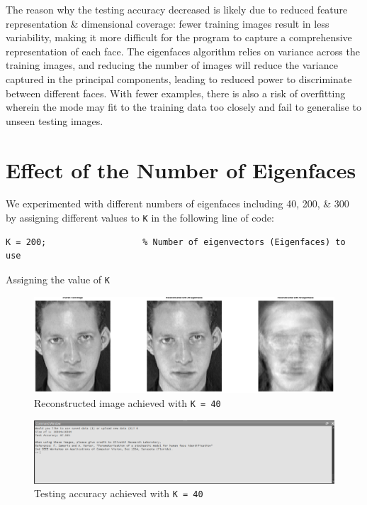 \documentclass[a4paper]{article}
\newenvironment{code}{\captionsetup{type=listing}}{}
\begin{document}
The reason why the testing accuracy decreased is likely due to reduced feature representation \& dimensional coverage:
fewer training images result in less variability, making it more difficult for the program to capture a comprehensive representation of each face.
The eigenfaces algorithm relies on variance across the training images, and reducing the number of images will reduce the variance captured in the principal components, leading to reduced power to discriminate between different faces.
With fewer examples, there is also a risk of overfitting wherein the mode may fit to the training data too closely and fail to generalise to unseen testing images.

\section{Effect of the Number of Eigenfaces}

We experimented with different numbers of eigenfaces including 40, 200, \& 300 by assigning different values to \texttt{K} in the following line of code:
\begin{code}
\begin{verbatim}
K = 200;                   % Number of eigenvectors (Eigenfaces) to use
\end{verbatim}
\caption{Assigning the value of \texttt{K}}
\end{code}

\begin{figure}[H]
    \centering
    \includegraphics[width=\textwidth]{./images/40acc.png}
    \caption{Reconstructed image achieved with \texttt{K = 40}}
\end{figure}
\begin{figure}[H]
    \centering
    \includegraphics[width=\textwidth]{./images/40rec.png}
    \caption{Testing accuracy achieved with \texttt{K = 40}}
\end{figure}
\end{document}
